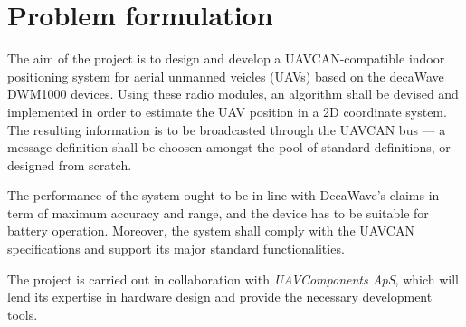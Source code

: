 \section{Problem formulation}

The aim of the project is to design and develop a UAVCAN-compatible indoor positioning system for aerial unmanned veicles (UAVs) based on the decaWave DWM1000 devices. 
Using these radio modules, an algorithm shall be devised and implemented in order to estimate the UAV position in a 2D coordinate system.
The resulting information is to be broadcasted through the UAVCAN bus --- a message definition shall be choosen amongst the pool of standard definitions, or designed from scratch.

The performance of the system ought to be in line with DecaWave's claims in term of maximum accuracy and range, and the device has to be suitable for battery operation.
Moreover, the system shall comply with the UAVCAN specifications and support its major standard functionalities.

The project is carried out in collaboration with \emph{UAVComponents ApS}, which will lend its expertise in hardware design and provide the necessary development tools.
